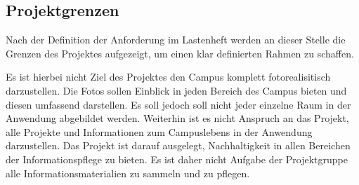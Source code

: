 \subsection{Projektgrenzen}
\label{sec:Projektgrenzen}

Nach der Definition der Anforderung im Lastenheft werden an dieser Stelle die
Grenzen des Projektes aufgezeigt, um einen klar definierten Rahmen zu schaffen.

Es ist hierbei nicht Ziel des Projektes den Campus komplett fotorealisitisch
darzustellen. Die Fotos sollen Einblick in jeden Bereich des Campus bieten und
diesen umfassend darstellen. Es soll jedoch soll nicht jeder einzelne Raum in
der Anwendung abgebildet werden. Weiterhin ist es nicht Anspruch an das
Projekt, alle Projekte und Informationen zum Campuslebens in der Anwendung
darzustellen. Das Projekt ist darauf ausgelegt, Nachhaltigkeit in allen
Bereichen der Informationspflege zu bieten. Es ist daher nicht Aufgabe der
Projektgruppe alle Informationsmaterialien zu sammeln und zu pflegen.
